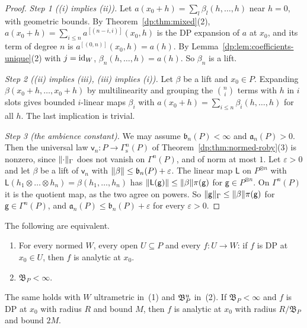 \begin{proof}
\emph{Step 1 ((i) implies (ii)).} Let $a(x_0+h)=\sum_l\beta_l(h,\dots,h)$ near $h=0$, with geometric bounds. By Theorem~\ref{dp:thm:mixed}(2), $a(x_0+h)=\sum_{i\le n}a^{[(n-i,i)]}(x_0,h)$ is the DP expansion of $a$ at $x_0$, and its term of degree $n$ is $a^{[(0,n)]}(x_0,h)=a(h)$. By Lemma~\ref{dp:lem:coefficients-unique}(2) with $j=\mathrm{id}_W$, $\beta_n(h,\dots,h)=a(h)$. So $\beta_n$ is a lift.

\emph{Step 2 ((ii) implies (iii), (iii) implies (i)).} Let $\beta$ be a lift and $x_0\in P$. Expanding $\beta(x_0+h,\dots,x_0+h)$ by multilinearity and grouping the $\binom ni$ terms with $h$ in $i$ slots gives bounded $i$\nobreakdash-linear maps $\beta_i$ with $a(x_0+h)=\sum_{i\le n}\beta_i(h,\dots,h)$ for all $h$. The last implication is trivial.

\emph{Step 3 (the ambience constant).} We may assume $\mathfrak b_n(P)<\infty$ and $\mathfrak a_n(P)>0$. Then the universal law $\mathsf v_n\colon P\to\Gamma^n_{\mathrm s}(P)$ of Theorem~\ref{dp:thm:normed-roby}(3) is nonzero, since $\lVert \cdot\rVert_\Gamma$ does not vanish on $\Gamma^n(P)$, and of norm at most $1$. Let $\varepsilon>0$ and let $\beta$ be a lift of $\mathsf v_n$ with $\lVert \beta\rVert\le\mathfrak b_n(P)+\varepsilon$. The linear map $\mathsf L$ on $P^{\otimes n}$ with $\mathsf L(h_1\otimes\dots\otimes h_n)=\beta(h_1,\dots,h_n)$ has $\lVert \mathsf L(\mathsf g)\rVert\le\lVert \beta\rVert\pi(\mathsf g)$ for $\mathsf g\in P^{\otimes n}$. On $\Gamma^n(P)$ it is the quotient map, as the two agree on powers. So $\lVert \mathsf g\rVert_\Gamma\le\lVert \beta\rVert\pi(\mathsf g)$ for $\mathsf g\in\Gamma^n(P)$, and $\mathfrak a_n(P)\le\mathfrak b_n(P)+\varepsilon$ for every $\varepsilon>0$.
\end{proof}

\begin{theorem}\label{dp:thm:agreement-criterion}
The following are equivalent.
\begin{enumerate}
\item For every normed $W$, every open $U\subseteq P$ and every $f\colon U\to W$: if $f$ is DP at $x_0\in U$, then $f$ is analytic at $x_0$.
\item $\mathfrak B_P<\infty$.
\end{enumerate}
The same holds with $W$ ultrametric in~\textup{(1)} and $\mathfrak B^{\rm u}_P$ in~\textup{(2)}. If $\mathfrak B_P<\infty$ and $f$ is DP at $x_0$ with radius $R$ and bound $M$, then $f$ is analytic at $x_0$ with radius $R/\mathfrak B_P$ and bound $2M$.
\end{theorem}

